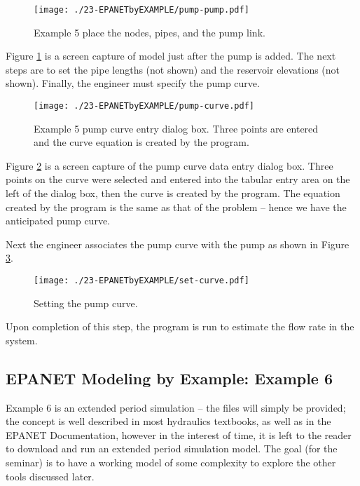 \begin{figure}[htbp] %
   \centering
   \texttt{[image: ./23-EPANETbyEXAMPLE/pump-pump.pdf]} 
   \caption{Example 5 place the nodes, pipes, and the pump link.}
   \label{fig:pump-pump.pdf}
\end{figure}
Figure \ref{fig:pump-pump.pdf} is a screen capture of model just after the pump is added.   The next steps are to set the pipe lengths (not shown) and the reservoir elevations (not shown).   Finally, the engineer must specify the pump curve.
\newpage

\begin{figure}[htbp] %
   \centering
   \texttt{[image: ./23-EPANETbyEXAMPLE/pump-curve.pdf]} 
   \caption{Example 5 pump curve entry dialog box.  Three points are entered and the curve equation is created by the program.}
   \label{fig:pump-curve.pdf}
\end{figure}
Figure \ref{fig:pump-curve.pdf} is a screen capture of the pump curve data entry dialog box.   Three points on the curve were selected and entered into the tabular entry area on the left of the dialog box, then the curve is created by the program.  The equation created by the program is the same as that of the problem -- hence we have the anticipated pump curve.
\newpage

Next the engineer associates the pump curve with the pump as shown in Figure \ref{fig:set-curve}.
\begin{figure}[htbp] %
   \centering
   \texttt{[image: ./23-EPANETbyEXAMPLE/set-curve.pdf]} 
   \caption{Setting the pump curve.}
   \label{fig:set-curve}
\end{figure}

Upon completion of this step, the program is run to estimate the flow rate in the system.
\clearpage

\subsection{EPANET Modeling by Example:  Example 6}
Example 6 is an extended period simulation -- the files will simply be provided; the concept is well described in most hydraulics textbooks, as well as in the EPANET Documentation, however in the interest of time, it is left to the reader to download and run an extended period simulation model.  The goal (for the seminar) is to have a working model of some complexity to explore the other tools discussed later.
\clearpage

